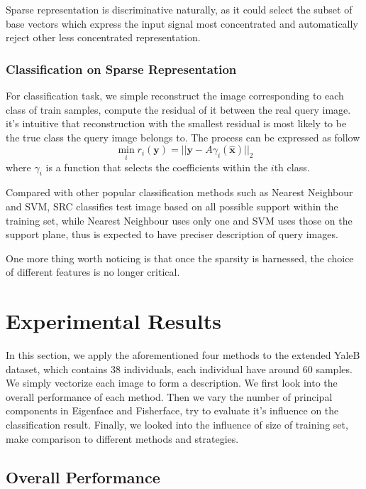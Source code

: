 \documentclass[conference]{IEEEtran}
\begin{document}
Sparse representation is discriminative naturally, as it could select the subset of base vectors which express the input signal most concentrated and automatically reject other less concentrated representation\cite{wangrobust}.
\subsubsection{Classification on Sparse Representation}
For classification task, we simple reconstruct the image corresponding to each class of train samples, compute the residual of it between the real query image. it's intuitive that reconstruction with the smallest residual is most likely to be the true class the query image belongs to. The process can be expressed as follow
\begin{equation}
	\min_{i}r_i(\bm{y})=||\bm{y}-A\gamma_i(\bm{\hat{x}})||_2
\end{equation} 
where $\gamma_i$ is a function that selects the coefficients within the $i$th class.

Compared with other popular classification methods such as Nearest Neighbour and SVM, SRC classifies test image based on all possible support within the training set\cite{wright2009robust}, while Nearest Neighbour uses only one and SVM uses those on the support plane, thus is expected to have preciser description of query images.

One more thing worth noticing is that once the sparsity is harnessed, the choice of different features is no longer critical\cite{wangrobust}.
\section{Experimental Results}
In this section, we apply the aforementioned four methods to the extended YaleB dataset, which contains 38 individuals, each individual have around 60 samples. We simply vectorize each image to form a description. We first look into the overall performance of each method. Then we vary the number of principal components in Eigenface and Fisherface, try to evaluate it's influence on the classification result. Finally, we looked into the influence of size of training set, make comparison to different methods and strategies.

\subsection{Overall Performance}
\end{document}

